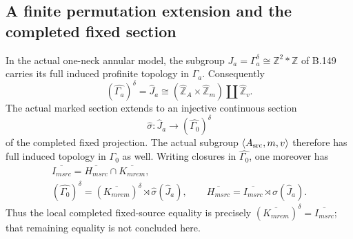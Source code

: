 \subsection*{A finite permutation extension and the completed fixed section}
\label{stmt:B154}
In the actual one-neck annular model, the subgroup
$J_a=\Gamma_a^\delta\cong\mathbb Z^2*\mathbb Z$ of B.149 carries
its full induced profinite topology in $\Gamma_a$. Consequently
\begin{equation}\label{eq:B154-fixed}
 (\widehat{\Gamma_a})^\delta
 =\widehat J_a
 \cong(\widehat{\mathbb Z}_A\times\widehat{\mathbb Z}_m)
       \amalg\widehat{\mathbb Z}_v.
\end{equation}
The actual marked section extends to an injective continuous section
\[
 \widehat\sigma:\widehat J_a\longrightarrow
       (\widehat{\Gamma_0})^\delta
\]
of the completed fixed projection. The actual subgroup
$\langle A_{\rm src},m,v\rangle$ therefore has full induced topology
in $\Gamma_0$ as well.
Writing closures in $\widehat{\Gamma_0}$, one moreover has
\begin{equation}\label{eq:B154-kernels}
\begin{gathered}
 \overline{I_{
m src}}
   =\overline{H_{
m src}}\cap\overline{K_{
m rem}},\\
 (\widehat{\Gamma_0})^\delta
   =(\overline{K_{
m rem}})^\delta
       \rtimes\widehat\sigma(\widehat J_a),\qquad
 \overline{H_{
m src}}
   =\overline{I_{
m src}}\rtimes\widehat\sigma(\widehat J_a).
\end{gathered}
\end{equation}
Thus the local completed fixed-source equality is precisely
$(\overline{K_{
m rem}})^\delta=\overline{I_{
m src}}$;
that remaining equality is not concluded here.
